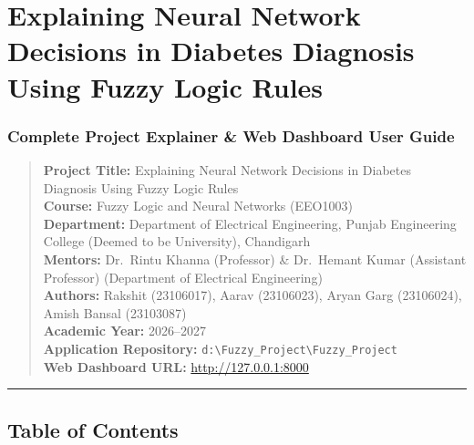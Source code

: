 \section{Explaining Neural Network Decisions in Diabetes Diagnosis Using
Fuzzy Logic
Rules}\label{explaining-neural-network-decisions-in-diabetes-diagnosis-using-fuzzy-logic-rules}

\subsubsection{Complete Project Explainer \& Web Dashboard User
Guide}\label{complete-project-explainer-web-dashboard-user-guide}

\begin{quote}
\textbf{Project Title:} Explaining Neural Network Decisions in Diabetes
Diagnosis Using Fuzzy Logic Rules\\
\textbf{Course:} Fuzzy Logic and Neural Networks (EEO1003)\\
\textbf{Department:} Department of Electrical Engineering, Punjab
Engineering College (Deemed to be University), Chandigarh\\
\textbf{Mentors:} Dr.~Rintu Khanna (Professor) \& Dr.~Hemant Kumar
(Assistant Professor) (Department of Electrical Engineering)\\
\textbf{Authors:} Rakshit (23106017), Aarav (23106023), Aryan Garg
(23106024), Amish Bansal (23103087)\\
\textbf{Academic Year:} 2026--2027\\
\textbf{Application Repository:}
\texttt{d:\textbackslash{}Fuzzy\_Project\textbackslash{}Fuzzy\_Project}\\
\textbf{Web Dashboard URL:} \url{http://127.0.0.1:8000}
\end{quote}

\begin{center}\rule{0.5\linewidth}{0.5pt}\end{center}

\subsection{Table of Contents}\label{table-of-contents}

